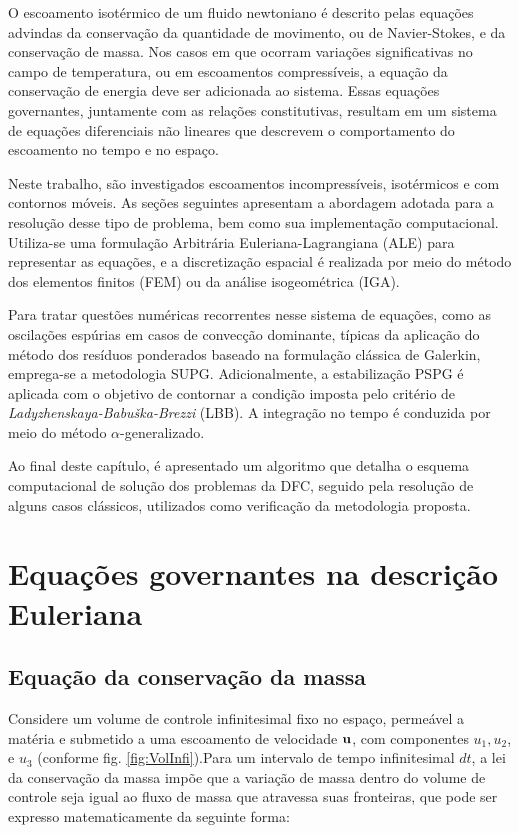 \documentclass[tese_patricia]{subfiles}%
\begin{document}
O escoamento isotérmico de um fluido newtoniano é descrito pelas equações advindas da conservação da quantidade de movimento, ou de Navier-Stokes, e da conservação de massa. Nos casos em que ocorram variações significativas no campo de temperatura, ou em escoamentos compressíveis, a equação da conservação de energia deve ser adicionada ao sistema. Essas equações governantes, juntamente com as relações constitutivas, resultam em um sistema de equações diferenciais não lineares que descrevem o comportamento do escoamento no tempo e no espaço. 

Neste trabalho, são investigados escoamentos incompressíveis, isotérmicos e com contornos móveis. As seções seguintes apresentam a abordagem adotada para a resolução desse tipo de problema, bem como sua implementação computacional. Utiliza-se uma formulação Arbitrária Euleriana-Lagrangiana (ALE) para representar as equações, e a discretização espacial é realizada por meio do método dos elementos finitos (FEM) ou da análise isogeométrica (IGA).

Para tratar questões numéricas recorrentes nesse sistema de equações, como as oscilações espúrias em casos de convecção dominante, típicas da aplicação do método dos resíduos ponderados baseado na formulação clássica de Galerkin, emprega-se a metodologia SUPG. Adicionalmente, a estabilização PSPG é aplicada com o objetivo de contornar a condição imposta pelo critério de \textit{Ladyzhenskaya-Babuška-Brezzi} (LBB). A integração no tempo é conduzida por meio do método $\alpha$-generalizado.

Ao final deste capítulo, é apresentado um algoritmo que detalha o esquema computacional de solução dos problemas da DFC, seguido pela resolução de alguns casos clássicos, utilizados como verificação da metodologia proposta.


\section{Equações governantes na descrição Euleriana} 


\subsection{Equação da conservação da massa}


Considere um volume de controle infinitesimal fixo no espaço, permeável a matéria e submetido a uma escoamento de velocidade $\mathbf{u}$, com componentes $u_1, u_2$, e $u_3$ (conforme fig. \ref{fig:VolInfi}).Para um intervalo de tempo infinitesimal $dt$, a lei da conservação da massa impõe que a variação de massa dentro do volume de controle seja igual ao fluxo de massa que atravessa suas fronteiras, que pode ser expresso matematicamente da seguinte forma:
\end{document}
